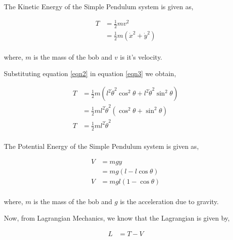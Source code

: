 \documentclass[12pt]{article}
\begin{document}
The Kinetic Energy of the Simple Pendulum system is given as,

\begin{equation} \label{eqn3}
    \begin{split}
        T &= \frac{1}{2} m v^{2} \\
        &= \frac{1}{2} m ( \dot{x}^{2} + \dot{y}^{2} ) \\
    \end{split}
\end{equation}

where, $m$ is the mass of the bob and $v$ is it's velocity.

\newpage

Substituting equation \ref{eqn2} in equation \ref{eqn3} we obtain,

\begin{equation} \label{eqn4}
    \begin{split}
        T &= \frac{1}{2} m ( l^{2} \dot{\theta}^{2} \cos^{2}{\theta} + l^{2} \dot{\theta}^{2} \sin^{2}{\theta} ) \\
        &= \frac{1}{2} m  l^{2} \dot{\theta}^{2} ( \cos^{2}{\theta} + \sin^{2}{\theta} ) \\
        T &= \frac{1}{2} m  l^{2} \dot{\theta}^{2} \\
    \end{split}
\end{equation}

The Potential Energy of the Simple Pendulum system is given as,

\begin{equation} \label{eqn5}
    \begin{split}
        V &= mgy \\
        &= mg ( l - l\cos{\theta} ) \\
        V &= mgl ( 1 - \cos{\theta} ) \\
    \end{split}
\end{equation}

where, $m$ is the mass of the bob and $g$ is the acceleration due to gravity.

Now, from Lagrangian Mechanics, we know that the Lagrangian is given by,

\begin{equation} \label{eqn6}
    \begin{split}
       L &= T - V \\
    \end{split}
\end{equation}
\end{document}
